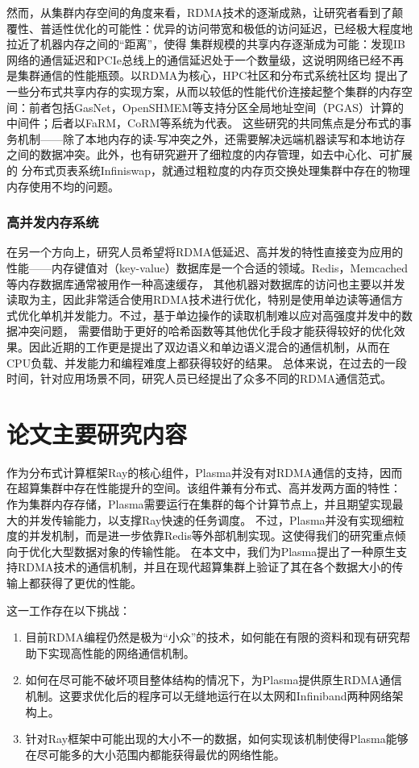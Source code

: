 然而，从集群内存空间的角度来看，RDMA技术的逐渐成熟，让研究者看到了颠覆性、普适性优化的可能性：优异的访问带宽和极低的访问延迟，已经极大程度地拉近了机器内存之间的“距离”，使得
集群规模的共享内存逐渐成为可能：\cite{}发现IB网络的通信延迟和PCIe总线上的通信延迟处于一个数量级，这说明网络已经不再是集群通信的性能瓶颈。以RDMA为核心，HPC社区和分布式系统社区均
提出了一些分布式共享内存的实现方案，从而以较低的性能代价连接起整个集群的内存空间：前者包括GasNet，OpenSHMEM等支持分区全局地址空间（PGAS）计算的中间件；后者以FaRM，CoRM等系统为代表。
这些研究的共同焦点是分布式的事务机制——除了本地内存的读-写冲突之外，还需要解决远端机器读写和本地访存之间的数据冲突。此外，也有研究避开了细粒度的内存管理，如去中心化、可扩展的
分布式页表系统Infiniswap，就通过粗粒度的内存页交换处理集群中存在的物理内存使用不均的问题。

\subsubsection{高并发内存系统}

在另一个方向上，研究人员希望将RDMA低延迟、高并发的特性直接变为应用的性能——内存键值对（key-value）数据库是一个合适的领域。Redis，Memcached等内存数据库通常被用作一种高速缓存，
其他机器对数据库的访问也主要以并发读取为主，因此非常适合使用RDMA技术进行优化，特别是使用单边读等通信方式优化单机并发能力。不过，基于单边操作的读取机制难以应对高强度并发中的数据冲突问题，
需要借助于更好的哈希函数等其他优化手段才能获得较好的优化效果。因此近期的工作更是提出了双边语义和单边语义混合的通信机制，从而在CPU负载、并发能力和编程难度上都获得较好的结果。
总体来说，在过去的一段时间，针对应用场景不同，研究人员已经提出了众多不同的RDMA通信范式。

\section{论文主要研究内容}

作为分布式计算框架Ray的核心组件，Plasma并没有对RDMA通信的支持，因而在超算集群中存在性能提升的空间。该组件兼有分布式、高并发两方面的特性：
作为集群内存存储，Plasma需要运行在集群的每个计算节点上，并且期望实现最大的并发传输能力，以支撑Ray快速的任务调度。
不过，Plasma并没有实现细粒度的并发机制，而是进一步依靠Redis等外部机制实现。这使得我们的研究重点倾向于优化大型数据对象的传输性能。
在本文中，我们为Plasma提出了一种原生支持RDMA技术的通信机制，并且在现代超算集群上验证了其在各个数据大小的传输上都获得了更优的性能。

这一工作存在以下挑战：

\begin{enumerate}
	\item 目前RDMA编程仍然是极为“小众”的技术，如何能在有限的资料和现有研究帮助下实现高性能的网络通信机制。
	\item 如何在尽可能不破坏项目整体结构的情况下，为Plasma提供原生RDMA通信机制。这要求优化后的程序可以无缝地运行在以太网和Infiniband两种网络架构上。
	\item 针对Ray框架中可能出现的大小不一的数据，如何实现该机制使得Plasma能够在尽可能多的大小范围内都能获得最优的网络性能。
\end{enumerate}

